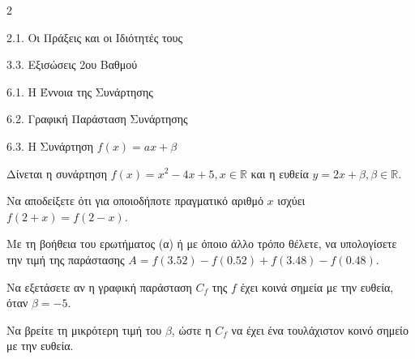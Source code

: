 \begin{ylh}{2}
    \item 2.1. Οι Πράξεις και οι Ιδιότητές τους
    \item 3.3. Εξισώσεις 2ου Βαθμού
    \item 6.1. Η Έννοια της Συνάρτησης
    \item 6.2. Γραφική Παράσταση Συνάρτησης
    \item 6.3. Η Συνάρτηση $f(x)=ax+\beta$
\end{ylh}
Δίνεται η συνάρτηση $f(x) = x^2 - 4x + 5, x \in \mathbb{R}$ και η ευθεία $y = 2x + \beta, \beta \in \mathbb{R}$.

\begin{alist}
\item Να αποδείξετε ότι για οποιοδήποτε πραγματικό αριθμό $x$ ισχύει $f(2+x) = f(2-x)$.
\item Με τη βοήθεια του ερωτήματος (α) ή με όποιο άλλο τρόπο θέλετε, να υπολογίσετε την τιμή της παράστασης $A = f(3.52) - f(0.52) + f(3.48) - f(0.48)$.
\item Να εξετάσετε αν η γραφική παράσταση $C_f$ της $f$ έχει κοινά σημεία με την ευθεία, όταν $\beta = -5$.
\item Να βρείτε τη μικρότερη τιμή του $\beta$, ώστε η $C_f$ να έχει ένα τουλάχιστον κοινό σημείο με την ευθεία.
\end{alist}

